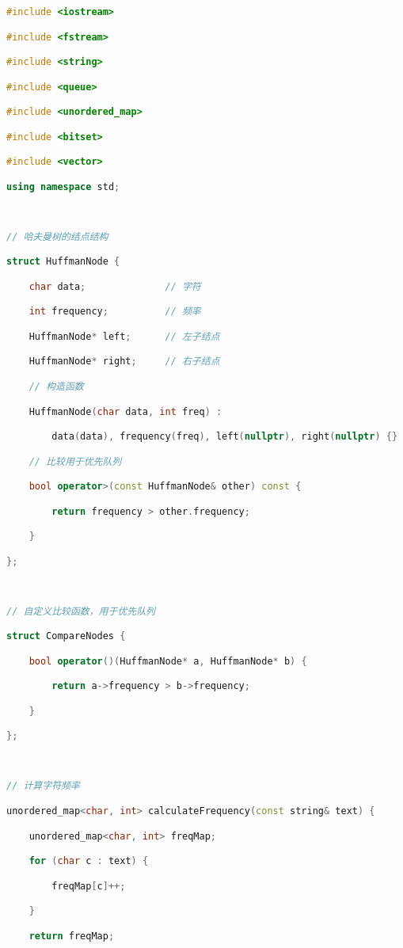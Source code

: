 \begin{lstlisting}[language=C++]
#include <iostream>

#include <fstream>

#include <string>

#include <queue>

#include <unordered_map>

#include <bitset>

#include <vector>

using namespace std;

  

// 哈夫曼树的结点结构

struct HuffmanNode {

    char data;              // 字符

    int frequency;          // 频率

    HuffmanNode* left;      // 左子结点

    HuffmanNode* right;     // 右子结点

    // 构造函数

    HuffmanNode(char data, int freq) :

        data(data), frequency(freq), left(nullptr), right(nullptr) {}

    // 比较用于优先队列

    bool operator>(const HuffmanNode& other) const {

        return frequency > other.frequency;

    }

};

  

// 自定义比较函数，用于优先队列

struct CompareNodes {

    bool operator()(HuffmanNode* a, HuffmanNode* b) {

        return a->frequency > b->frequency;

    }

};

  

// 计算字符频率

unordered_map<char, int> calculateFrequency(const string& text) {

    unordered_map<char, int> freqMap;

    for (char c : text) {

        freqMap[c]++;

    }

    return freqMap;


\end{lstlisting}
